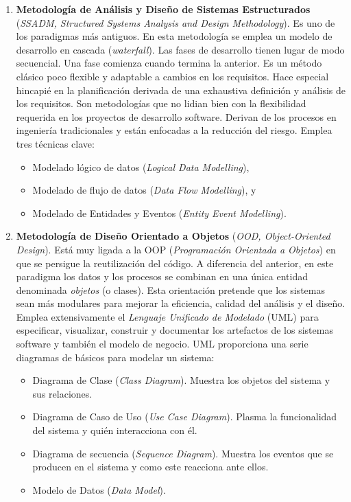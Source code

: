 \begin{enumerate}
\item \textbf{Metodología de Análisis y Diseño de Sistemas Estructurados} 
(\emph{SSADM, Structured Systems Analysis and Design 
Methodology}). Es uno de los paradigmas más antiguos. En esta 
metodología se emplea un modelo de desarrollo en cascada 
(\emph{waterfall}). Las fases de 
desarrollo tienen lugar de modo secuencial. Una fase comienza cuando termina 
la anterior. Es un método clásico poco flexible y adaptable a cambios en los 
requisitos. Hace especial hincapié en la planificación derivada de una 
exhaustiva definición y análisis de los requisitos. Son metodologías que no 
lidian bien con la flexibilidad requerida en los proyectos de desarrollo 
software. Derivan de los procesos en  ingeniería tradicionales y están 
enfocadas a la reducción del riesgo. Emplea tres técnicas clave:

\begin{itemize}
\item Modelado lógico de datos (\emph{Logical Data 
Modelling}),
\item Modelado de flujo de datos (\emph{Data Flow Modelling}), y
\item Modelado de Entidades y Eventos (\emph{Entity Event
  Modelling}).
\end{itemize} 

\item \textbf{Metodología de Diseño Orientado a Objetos} (\emph{OOD,  
Object-Oriented Design}). Está muy ligada a la OOP (\emph{Programación 
Orientada a Objetos}) en que se persigue la reutilización del código. A diferencia del anterior, en este paradigma los datos y los procesos se combinan en una única entidad denominada \emph{objetos} (o clases). Esta orientación pretende que los sistemas sean más modulares para mejorar la eficiencia, calidad del análisis y el diseño. Emplea extensivamente el \emph{Lenguaje Unificado de Modelado} (UML) para especificar, visualizar, construir y documentar los artefactos de los sistemas software y  también el modelo de negocio. UML proporciona una serie diagramas de básicos para modelar un sistema: 

\begin{itemize}
\item Diagrama de Clase (\emph{Class Diagram}). Muestra los objetos del sistema y sus relaciones. 
\item Diagrama de Caso de Uso (\emph{Use Case Diagram}). Plasma la
  funcionalidad del sistema y quién interacciona con él.
\item Diagrama de secuencia (\emph{Sequence Diagram}). Muestra los eventos que se
  producen en el sistema y como este reacciona ante ellos. 
\item Modelo de Datos (\emph{Data Model}).
\end{itemize} 
                               

\end{enumerate}
